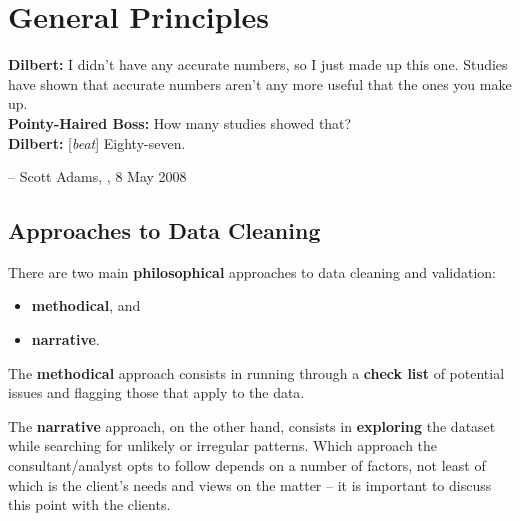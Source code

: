 \section{General Principles}
\begin{tcolorbox}[title=Data Validation]
\textbf{Dilbert:} I didn't have any accurate numbers, so I just made up this one. Studies have shown that accurate numbers aren't any more useful that the ones you make up. \\ 
\textbf{Pointy-Haired Boss:} How many studies showed that? \\ 
\textbf{Dilbert:} [\textit{beat}] Eighty-seven.\\[-0.6cm]
\begin{flushright}
-- Scott Adams, , 8 May 2008
\end{flushright}
\end{tcolorbox}
\noindent
\subsection{Approaches to Data Cleaning}
There are two main \textbf{philosophical} approaches to data cleaning and validation: 
\begin{itemize}[noitemsep]
\item \textbf{methodical}, and  
\item \textbf{narrative}.
\end{itemize}
 The \textbf{methodical} approach consists in running through a \textbf{check list} of potential issues and flagging those that apply to the data.
\par The \textbf{narrative} approach, on the other hand, consists in \textbf{exploring} the dataset while searching for unlikely or irregular patterns. 
\newl
Which approach the consultant/analyst opts to follow depends on a number of factors, not least of which is the client's needs and views  on the matter -- it is important  to discuss this point with the clients.
